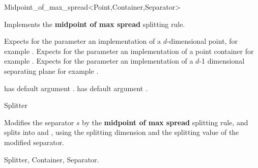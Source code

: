 

\begin{ccRefFunctionObjectClass}{Midpoint_of_max_spread<Point,Container,Separator>}  %


\ccDefinition
Implements the {\bf midpoint of max spread} splitting rule.

\ccParameters

Expects for the parameter  an implementation of a $d$-dimensional point,
for example . Expects for the parameter  an implementation
of a point container for example .
Expects for the parameter  an implementation of a $d$-1 dimensional 
separating plane for example .

 has default argument .
 has default argument . 



\ccIsModel

Splitter

\ccTypes



\ccOperations

{Modifies the separator $s$ by the {\bf midpoint of max spread} splitting rule, 
and splits  into  and ,
using the splitting dimension and the splitting value of the modified separator.
}

\ccSeeAlso

Splitter, Container, Separator.

\end{ccRefFunctionObjectClass}


